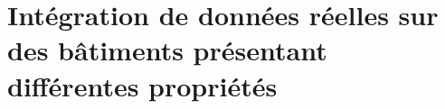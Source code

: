 
    \newpage\section{Intégration de données réelles sur des bâtiments présentant différentes propriétés}\label{sec:integration-de-donnees-reelles-sur-des-batiments-presentant-differentes-proprietes}
        \cite{subhourlysixdatasets}